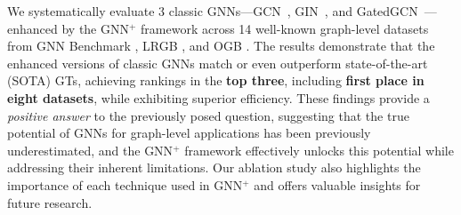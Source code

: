 We systematically evaluate 3 classic GNNs—GCN~\cite{kipf2017semisupervised}, GIN~\cite{xu2018powerful}, and GatedGCN~\cite{bresson2017residual}—enhanced by the GNN$^+$ framework across 14 well-known graph-level datasets from GNN Benchmark \cite{dwivedi2023benchmarking}, LRGB \cite{dwivedi2022long}, and OGB \cite{hu2020open}. The results demonstrate that the enhanced versions of classic GNNs match or even outperform state-of-the-art (SOTA) GTs, achieving rankings in the \textbf{top three}, including \textbf{first place in eight datasets}, while exhibiting superior efficiency. These findings provide a \emph{positive answer} to the previously posed question, suggesting that the true potential of GNNs for graph-level applications has been previously underestimated, and the GNN$^+$ framework effectively unlocks this potential while addressing their inherent limitations. 
Our ablation study also highlights the importance of each technique used in GNN$^+$ and offers valuable insights for future research.



